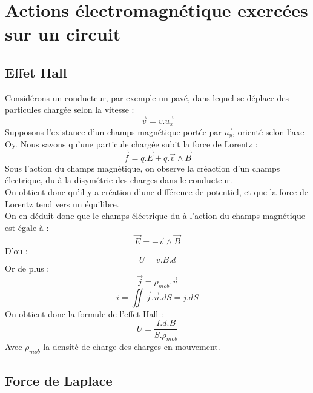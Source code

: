 
\chapter{Actions électromagnétique exercées sur un circuit}
\section{Effet Hall}
\begin{de}
Considérons un conducteur, par exemple un pavé, dans lequel se déplace des particules chargée selon la vitesse :
$$\overrightarrow{v}=v.\overrightarrow{u_x}$$
Supposons l'existance d'un champs magnétique portée par $\overrightarrow{u_y}$, orienté selon l'axe Oy. Nous savons qu'une particule chargée subit la force de Lorentz : 
$$\overrightarrow{f} = q.\overrightarrow{E}+q.\overrightarrow{v}\wedge\overrightarrow{B}$$
Sous l'action du champs magnétique, on observe la créaction d'un champs électrique, du à la disymétrie des charges dans le conducteur.\\
On obtient donc qu'il y a création d'une différence de potentiel, et que la force de Lorentz tend vers un équilibre.\\
On en déduit donc que le champs éléctrique du à l'action du champs magnétique est égale à : 
$$\overrightarrow{E} = -\overrightarrow{v}\wedge\overrightarrow{B}$$
D'ou : 
$$U = v.B.d$$
Or de plus : 
$$\overrightarrow{j} = \rho_{mob}.\overrightarrow{v}$$
$$i = \iint \overrightarrow{j}.\overrightarrow{n}.dS = j.dS$$
On obtient donc la formule de l'effet Hall : 
$$U = \dfrac{I.d.B}{S.\rho_{mob}}$$
Avec $\rho_{mob}$ la densité de charge des charges en mouvement.
\end{de}
\section{Force de Laplace}

